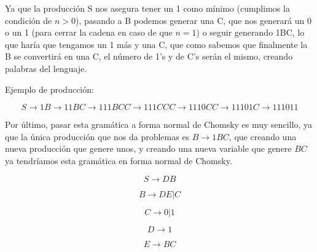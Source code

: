 \documentclass[12pt, spanish]{article}
\begin{document}
Ya que la producción S nos asegura tener un 1 como mínimo (cumplimos la condición de $n > 0$), pasando a B podemos generar una C, que nos generará un 0 o un 1 (para cerrar la cadena en caso de que $n = 1$) o seguir generando 1BC, lo que haría que tengamos un 1 más y una C, que como sabemos que finalmente la B se convertirá en una C, el número de 1's y de C's serán el mismo, creando palabras del lenguaje.

Ejemplo de producción:

$$ S \rightarrow 1B \rightarrow 11BC \rightarrow 111BCC \rightarrow 111CCC \rightarrow 1110CC \rightarrow 11101C \rightarrow 111011 $$


\newpage

Por último, pasar esta gramática a forma normal de Chomsky es muy sencillo, ya que la única producción que nos da problemas es $B \rightarrow 1BC$, que creando una nueva producción que genere unos, y creando una nueva variable que genere $BC$ ya tendríamos esta gramática en forma normal de Chomsky.


$$ S \rightarrow DB  $$

$$ B \rightarrow DE | C $$

$$ C \rightarrow 0 | 1 $$

$$ D \rightarrow  1 $$

$$ E \rightarrow  BC $$
\end{document}
